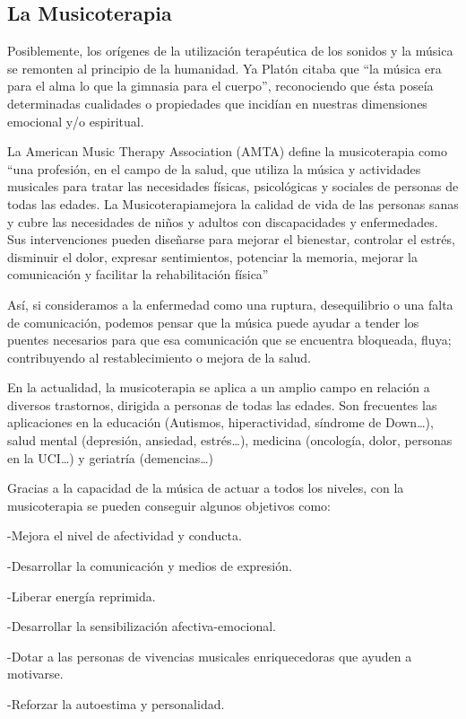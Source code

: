\documentclass{bmcart}
\begin{document}
\subsection*{La Musicoterapia}
Posiblemente, los orígenes de la utilización terapéutica de los sonidos y la música se remonten al principio de la humanidad. Ya Platón citaba que “la música era para el alma lo que la gimnasia para el cuerpo”, reconociendo que ésta poseía determinadas cualidades o propiedades que incidían en nuestras dimensiones emocional y/o espiritual.


La American Music Therapy Association (AMTA) define la musicoterapia como “una profesión, en el campo de la salud, que utiliza la música y actividades musicales para tratar las necesidades físicas, psicológicas y sociales de personas de todas las edades. La Musicoterapiamejora la calidad de vida de las personas sanas y cubre las necesidades de niños y adultos con discapacidades y enfermedades. Sus intervenciones pueden diseñarse para mejorar el bienestar, controlar el estrés, disminuir el dolor, expresar sentimientos, potenciar la memoria, mejorar la comunicación y facilitar la rehabilitación física”

Así, si consideramos a la enfermedad como una ruptura, desequilibrio o una falta de comunicación, podemos pensar que la música puede ayudar a tender los puentes necesarios para que esa comunicación que se encuentra bloqueada, fluya; contribuyendo al restablecimiento o mejora de la salud.

En la actualidad, la musicoterapia se aplica a un amplio campo en relación a diversos trastornos, dirigida a personas de todas las edades. Son frecuentes las aplicaciones en la educación (Autismos, hiperactividad, síndrome de Down…), salud mental (depresión, ansiedad, estrés…), medicina (oncología, dolor, personas en la UCI…) y geriatría (demencias…)

Gracias a la capacidad de la música de actuar a todos los niveles, con la musicoterapia se pueden conseguir algunos objetivos como:

-Mejora el nivel de afectividad y conducta.

-Desarrollar la comunicación y medios de expresión.

-Liberar energía reprimida.

-Desarrollar la sensibilización afectiva-emocional.

-Dotar a las personas de vivencias musicales enriquecedoras que ayuden a motivarse.

-Reforzar la autoestima y personalidad.
\end{document}
